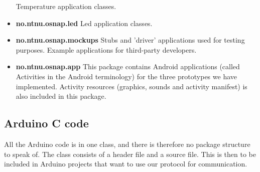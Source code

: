 \begin{itemize}
		Temperature application classes.
	\item \textbf{no.ntnu.osnap.led}\newline
		Led application classes.
	\item \textbf{no.ntnu.osnap.mockups}  \newline \label{section:mockup}
		Stubs and 'driver' applications used for testing purposes.
		Example applications for third-party developers.
	\item \textbf{no.ntnu.osnap.app} \newline
		This package contains Android applications (called Activities in the Android terminology) for the three prototypes
		we have implemented. Activity resources (graphics, sounds and activity manifest) is also included in this package.
\end{itemize}

\subsection{Arduino C code}
All the Arduino code is in one class, and there is therefore no package structure to speak of.
The class consists of a header file and a source file. This is then to be included in Arduino projects
that want to use our protocol for communication.